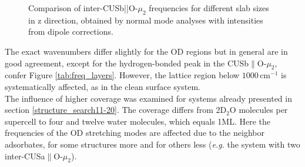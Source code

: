 \documentclass[11pt,DIV=13,BCOR=5mm,a4paper,headinclude]{scrbook}
\newcommand\todo[1]{\textcolor{red}{TODO: \textit{{#1}}}}
\begin{document}
\begin{figure}[!h]
    \centering
             \quad
             \quad
             \caption{Comparison of inter-CUSb||O-$\mu_2$ frequencies for different slab sizes in z direction, obtained by normal mode analyses with intensities from dipole corrections.}
            \label{abb:iCb2_size_comp}
\end{figure}
The exact wavenumbers differ slightly for the OD regions but in general are in good agreement, except for the hydrogen-bonded peak in the CUSb$\parallel$O-$\mu_2$, confer Figure \ref{tab:freq_layers}.
However, the lattice region below $1000\,$cm$^{-1}$ is systematically affected, as in the clean surface system.
\\
The influence of higher coverage was examined for systems already presented in section \ref{structure_search11-20}.
The coverage differs from 2D$_2$O molecules per supercell to four and twelve water molecules, which equals 1ML.
Here the frequencies of the OD stretching modes are affected due to the neighbor adsorbates, for some structures more and for others less (\textit{e.g.} the system with two inter-CUSa$\parallel$O-$\mu_2$).
\end{document}
